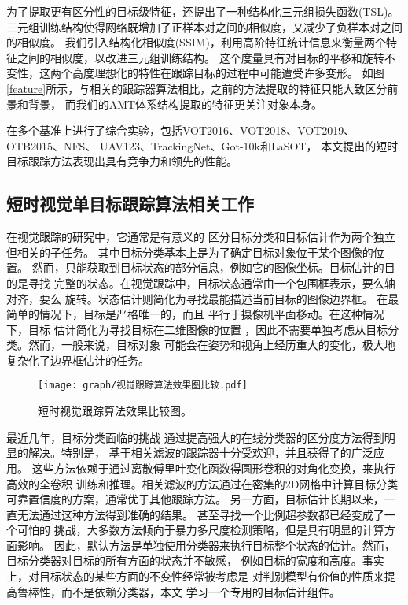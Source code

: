\documentclass[promaster]{thesis-uestc}
\begin{document}
为了提取更有区分性的目标级特征，还提出了一种结构化三元组损失函数(TSL)。
三元组训练结构使得网络既增加了正样本对之间的相似度，又减少了负样本对之间的相似度。
我们引入结构化相似度(SSIM)，利用高阶特征统计信息来衡量两个特征之间的相似度，以改进三元组训练结构。
这个度量具有对目标的平移和旋转不变性，这两个高度理想化的特性在跟踪目标的过程中可能遭受许多变形。
如图\ref{feature}所示，与相关的跟踪器算法相比，之前的方法提取的特征只能大致区分前景和背景，
而我们的AMT体系结构提取的特征更关注对象本身。


在多个基准上进行了综合实验，包括VOT2016\cite{VOT16}、VOT2018\cite{VOT18}、VOT2019、OTB2015\cite{OTB15}、NFS\cite{NFS}、
UAV123\cite{UAV}、TrackingNet\cite{TrackingNet}、Got-10k\cite{GOT10k}和LaSOT\cite{LaSOT}，
本文提出的短时目标跟踪方法表现出具有竞争力和领先的性能。



\subsection{短时视觉单目标跟踪算法相关工作}
在视觉跟踪的研究中，它通常是有意义的
区分目标分类和目标估计作为两个独立但相关的子任务。
其中目标分类基本上是为了确定目标对象位于某个图像的位置。
然而，只能获取到目标状态的部分信息，例如它的图像坐标。目标估计的目的是寻找
完整的状态。在视觉跟踪中，目标状态通常由一个包围框表示，要么轴对齐\cite{NFS}，要么
旋转\cite{kristan2018sixth}。状态估计则简化为寻找最能描述当前目标的图像边界框。
在最简单的情况下，目标是严格唯一的，而且
平行于摄像机平面移动。在这种情况下，目标
估计简化为寻找目标在二维图像的位置
，因此不需要单独考虑从目标分类。然而，一般来说，目标对象
可能会在姿势和视角上经历重大的变化，极大地复杂化了边界框估计的任务。


\begin{figure*}[htp!]
	\centering  
	\texttt{[image: graph/视觉跟踪算法效果图比较.pdf]}
    \caption{短时视觉跟踪算法效果比较图。}
	\label{figure3}
\end{figure*}

最近几年，目标分类面临的挑战
通过提高强大的在线分类器\cite{henriques2014high}\cite{nam2016learning}的区分度方法得到明显的解决。特别是，
基于相关滤波的跟踪器\cite{ma2015hierarchical}\cite{henriques2014high}十分受欢迎，并且获得了的广泛应用。
这些方法依赖于通过离散傅里叶变化函数得圆形卷积的对角化变换，来执行高效的全卷积
训练和推理。相关滤波的方法通过在密集的2D网格中计算目标分类可靠置信度的方案，通常优于其他跟踪方法。
另一方面，目标估计长期以来，一直无法通过这种方法得到准确的结果。
甚至寻找一个比例超参数都已经变成了一个可怕的
挑战，大多数方法倾向于暴力多尺度检测策略，但是具有明显的计算方面影响。
因此，默认方法是单独使用分类器来执行目标整个状态的估计。然而，目标分类器对目标的所有方面的状态并不敏感，
例如目标的宽度和高度。事实上，对目标状态的某些方面的不变性经常被考虑是
对判别模型有价值的性质来提高鲁棒性\cite{siamfc}，而不是依赖分类器，本文
学习一个专用的目标估计组件。
\end{document}
